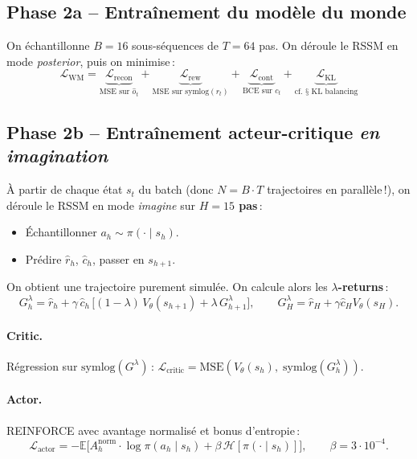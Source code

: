 \documentclass[11pt,a4paper]{article}
\newcommand{\rssm}{RSSM}
\newcommand{\bluebf}[1]{\textbf{\color{enseirbblue}#1}}
\begin{document}
\subsection{Phase 2a -- Entraînement du modèle du monde}
On échantillonne \(B=16\) sous-séquences de \(T=64\) pas. On déroule le
\rssm{} en mode \emph{posterior}, puis on minimise\,:
\begin{equation}
\boxed{\;
\mathcal{L}_{\text{WM}} =
\underbrace{\mathcal{L}_{\text{recon}}}_{\text{MSE sur } \hat o_t}
+\underbrace{\mathcal{L}_{\text{rew}}}_{\text{MSE sur } \mathrm{symlog}(r_t)}
+\underbrace{\mathcal{L}_{\text{cont}}}_{\text{BCE sur } c_t}
+\underbrace{\mathcal{L}_{\text{KL}}}_{\text{cf. § KL balancing}}
\;}
\end{equation}

\subsection{Phase 2b -- Entraînement acteur-critique \emph{en imagination}}
À partir de chaque état \(s_t\) du batch (donc \(N = B\cdot T\)
trajectoires en parallèle\,!), on déroule le \rssm{} en mode \emph{imagine}
sur \bluebf{\(H=15\) pas}\,:
\begin{itemize}
    \item Échantillonner \(a_h \sim \pi(\cdot\mid s_h)\).
    \item Prédire \(\hat r_h\), \(\hat c_h\), passer en \(s_{h+1}\).
\end{itemize}
On obtient une trajectoire purement simulée. On calcule alors les
\bluebf{\(\lambda\)-returns}\,:
\begin{equation}
G^\lambda_h = \hat r_h + \gamma\,\hat c_h\,
\bigl[(1-\lambda)\,V_\theta(s_{h+1}) + \lambda\,G^\lambda_{h+1}\bigr],
\qquad G^\lambda_H = \hat r_H + \gamma \hat c_H V_\theta(s_H).
\end{equation}

\paragraph{Critic.} Régression sur \(\mathrm{symlog}(G^\lambda)\)\,:
\(\mathcal{L}_{\text{critic}} = \mathrm{MSE}(V_\theta(s_h),\;\mathrm{symlog}(G^\lambda_h))\).

\paragraph{Actor.} REINFORCE avec avantage normalisé et bonus d'entropie\,:
\begin{equation}
\mathcal{L}_{\text{actor}} = -\mathbb{E}\bigl[
A^{\text{norm}}_h \cdot \log\pi(a_h\mid s_h) + \beta\, \mathcal{H}[\pi(\cdot\mid s_h)]
\bigr],\qquad \beta = 3\cdot 10^{-4}.
\end{equation}
\end{document}
